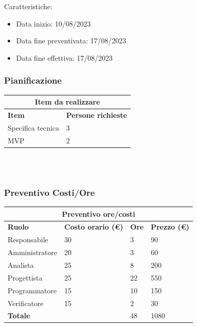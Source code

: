 \documentclass[9pt]{article}
\begin{document}
Caratteristiche:

\begin{itemize}
	\item Data inizio: 10/08/2023
	\item Data fine preventivata: 17/08/2023
	\item Data fine effettiva: 17/08/2023
\end{itemize}
\subsubsection{Pianificazione}
\begin{center}
	\begin{tabularx}{\textwidth}{|X|X|}
		\hline
		\multicolumn{2}{|c|}{\textbf{Item da realizzare}}     \\
		\hline
		\hline
		\textbf{Item}            & \textbf{Persone richieste} \\
		\hline
		Specifica tecnica        	& 3                          \\
		\hline
		MVP        					& 2           \\
		\hline
	\end{tabularx}\\[8pt]
	\mbox{}\\
\end{center}
\subsubsection{Preventivo Costi/Ore}
\begin{center}
	\begin{tabularx}{\textwidth}{|X|X|X|X|}
		\hline
		\multicolumn{4}{|c|}{\textbf{Preventivo ore/costi}}                                      \\
		\hline
		\hline
		\textbf{Ruolo}  & \textbf{Costo orario (\euro)} & \textbf{Ore} & \textbf{Prezzo (\euro)} \\
		\hline									
		Responsabile    &	30		&	3		&	90		\\
		\hline									
		Amministratore  &	20		&	3		&	60		\\
		\hline									
		Analista        &	25		&	8		&	200		\\
		\hline									
		Progettista     &	25		&	22		&	550		\\
		\hline									
		Programmatore   &	15		&	10		&	150		\\
		\hline									
		Verificatore    &	15		&	2		&	30		\\
		\hline									
		\textbf{Totale} &			&	48		&	1080		\\
		\hline																
	\end{tabularx}\\[8pt]
	\mbox{}\\
\end{center}
\end{document}
